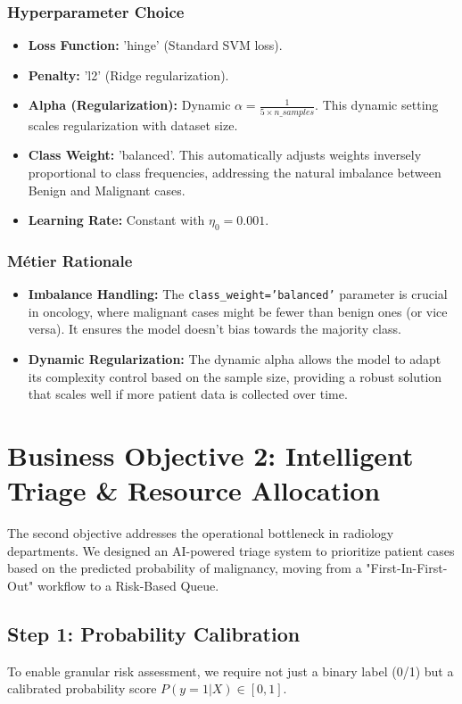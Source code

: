 \subsubsection{Hyperparameter Choice}
\begin{itemize}
    \item \textbf{Loss Function:} 'hinge' (Standard SVM loss).
    \item \textbf{Penalty:} 'l2' (Ridge regularization).
    \item \textbf{Alpha (Regularization):} Dynamic $\alpha = \frac{1}{5 \times n\_samples}$. This dynamic setting scales regularization with dataset size.
    \item \textbf{Class Weight:} 'balanced'. This automatically adjusts weights inversely proportional to class frequencies, addressing the natural imbalance between Benign and Malignant cases.
    \item \textbf{Learning Rate:} Constant with $\eta_0 = 0.001$.
\end{itemize}

\subsubsection{Métier Rationale}
\begin{itemize}
    \item \textbf{Imbalance Handling:} The \texttt{class\_weight='balanced'} parameter is crucial in oncology, where malignant cases might be fewer than benign ones (or vice versa). It ensures the model doesn't bias towards the majority class.
    \item \textbf{Dynamic Regularization:} The dynamic alpha allows the model to adapt its complexity control based on the sample size, providing a robust solution that scales well if more patient data is collected over time.
\end{itemize}

\section{Business Objective 2: Intelligent Triage \& Resource Allocation}
The second objective addresses the operational bottleneck in radiology departments. We designed an AI-powered triage system to prioritize patient cases based on the predicted probability of malignancy, moving from a "First-In-First-Out" workflow to a Risk-Based Queue.

\subsection{Step 1: Probability Calibration}
To enable granular risk assessment, we require not just a binary label (0/1) but a calibrated probability score $P(y=1|X) \in [0, 1]$.

